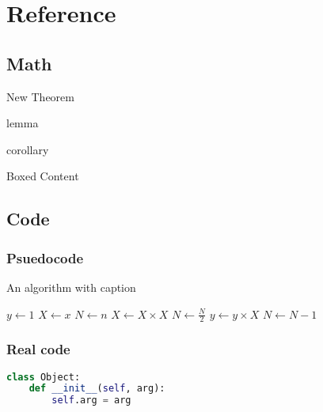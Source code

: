 
\section{Reference}
\subsection{Math}
\begin{theorem}
    New Theorem
\end{theorem}
\begin{lemma}
    lemma
\end{lemma}
\begin{corollary}
    corollary
\end{corollary}
\begin{tcolorbox}
    Boxed Content
\end{tcolorbox}

\subsection{Code}
\subsubsection{Psuedocode}
\begin{algorithm}
\caption{An algorithm with caption}\label{alg:cap}
\begin{algorithmic}[1]
\State $y \gets 1$
\State $X \gets x$
\State $N \gets n$
        \State $X \gets X \times X$
        \State $N \gets \frac{N}{2}$  
        \State $y \gets y \times X$
        \State $N \gets N - 1$
    \EndIf
\EndWhile
\end{algorithmic}
\end{algorithm}

\subsubsection{Real code}
\begin{lstlisting}[language=Python]
class Object:
    def __init__(self, arg):
        self.arg = arg
\end{lstlisting}
